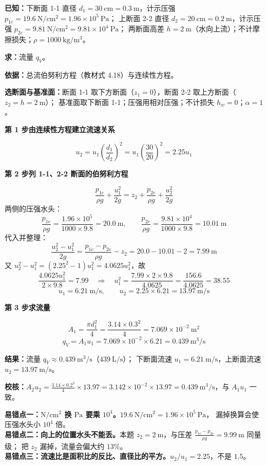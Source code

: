 \begin{jie}
\textbf{已知：}下断面 1-1 直径 $d_1=30\ \mathrm{cm}=0.3\ \mathrm{m}$，计示压强 $p_{1e}=19.6\ \mathrm{N/cm^2}=1.96\times10^5\ \mathrm{Pa}$；
上断面 2-2 直径 $d_2=20\ \mathrm{cm}=0.2\ \mathrm{m}$，计示压强 $p_{2e}=9.81\ \mathrm{N/cm^2}=9.81\times10^4\ \mathrm{Pa}$；
两断面高差 $h=2\ \mathrm{m}$（水向上流）；不计摩擦损失；$\rho=1000\ \mathrm{kg/m^3}$。

\textbf{求：}流量 $q_V$。

\textbf{依据：}总流伯努利方程（教材式 4.18）与连续性方程。

\textbf{选断面与基准面：}断面 1-1 取下方断面（$z_1=0$），断面 2-2 取上方断面（$z_2=h=2\ \mathrm{m}$）；
基准面取下断面 1-1；压强用相对压强；不计损失 $h_w=0$；$\alpha=1$。

\textbf{第 1 步\quad 由连续性方程建立流速关系}

\[ u_2=u_1\left(\frac{d_1}{d_2}\right)^2=u_1\left(\frac{30}{20}\right)^2=2.25u_1 \]

\textbf{第 2 步\quad 列 1-1、2-2 断面的伯努利方程}

\[ \frac{p_{1e}}{\rho g}+\frac{u_1^2}{2g}=z_2+\frac{p_{2e}}{\rho g}+\frac{u_2^2}{2g} \]
两侧的压强水头：
\[ \frac{p_{1e}}{\rho g}=\frac{1.96\times10^5}{1000\times9.8}=20.0\ \mathrm{m},\qquad
   \frac{p_{2e}}{\rho g}=\frac{9.81\times10^4}{1000\times9.8}=10.01\ \mathrm{m} \]
代入并整理：
\[ \frac{u_2^2-u_1^2}{2g}=\frac{p_{1e}-p_{2e}}{\rho g}-z_2=20.0-10.01-2=7.99\ \mathrm{m} \]
又 $u_2^2-u_1^2=(2.25^2-1)u_1^2=4.0625u_1^2$，故
\[ \frac{4.0625u_1^2}{2\times9.8}=7.99\quad\Longrightarrow\quad u_1^2=\frac{7.99\times2\times9.8}{4.0625}=\frac{156.6}{4.0625}=38.55 \]
\[ u_1=6.21\ \mathrm{m/s},\qquad u_2=2.25\times6.21=13.97\ \mathrm{m/s} \]

\textbf{第 3 步\quad 求流量}

\[ A_1=\frac{\pi d_1^2}{4}=\frac{3.14\times0.3^2}{4}=7.069\times10^{-2}\ \mathrm{m^2} \]
\[ q_V=A_1u_1=7.069\times10^{-2}\times6.21=0.439\ \mathrm{m^3/s} \]

\textbf{结果：}流量 $q_V\approx0.439\ \mathrm{m^3/s}$（$439\ \mathrm{L/s}$）；
下断面流速 $u_1=6.21\ \mathrm{m/s}$，上断面流速 $u_2=13.97\ \mathrm{m/s}$。

\textbf{校核：}$A_2u_2=\frac{3.14\times0.2^2}{4}\times13.97=3.142\times10^{-2}\times13.97=0.439\ \mathrm{m^3/s}$，与 $A_1u_1$ 一致。
\end{jie}

\begin{yicuo}
\textbf{易错点一：$\mathrm{N/cm^2}$ 换 $\mathrm{Pa}$ 要乘 $10^4$。}$19.6\ \mathrm{N/cm^2}=1.96\times10^5\ \mathrm{Pa}$，
漏掉换算会使压强水头小 $10^4$ 倍。\\
\textbf{易错点二：向上的位置水头不能丢。}本题 $z_2=2\ \mathrm{m}$，与压差 $\frac{p_{1e}-p_{2e}}{\rho g}=9.99\ \mathrm{m}$ 同量级；
把 $z_2$ 漏掉，流量会偏大约 $13\%$。\\
\textbf{易错点三：流速比是面积比的反比、直径比的平方。}$u_2/u_1=2.25$，不是 $1.5$。
\end{yicuo}

